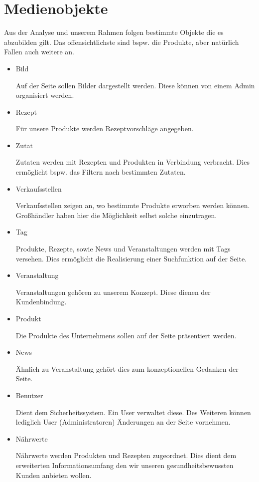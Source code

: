 \documentclass[12pt,a4paper,oneside,ngerman]{article}
\begin{document}
\section{Medienobjekte} %
Aus der Analyse und unserem Rahmen folgen bestimmte Objekte die es abzubilden gilt. Das offensichtlichste sind bspw. die Produkte, aber natürlich Fallen auch weitere an.
\begin{itemize}
\item Bild

Auf der Seite sollen Bilder dargestellt werden. Diese können von einem Admin organisiert werden.

\item Rezept

Für unsere Produkte werden Rezeptvorschläge angegeben.

\item Zutat

Zutaten werden mit Rezepten und Produkten in Verbindung verbracht. Dies ermöglicht bspw. das Filtern nach bestimmten Zutaten.

\item Verkaufsstellen

Verkaufsstellen zeigen an, wo bestimmte Produkte erworben werden können. Großhändler haben hier die Möglichkeit selbst solche einzutragen.

\item Tag

Produkte, Rezepte, sowie News und Veranstaltungen werden mit Tags versehen. Dies ermöglicht die Realisierung einer Suchfunktion auf der Seite.

\item Veranstaltung

Veranstaltungen gehören zu unserem Konzept. Diese dienen der Kundenbindung.

\item Produkt

Die Produkte des Unternehmens sollen auf der Seite präsentiert werden.

\item News

Ähnlich zu Veranstaltung gehört dies zum konzeptionellen Gedanken der Seite.

\item Benutzer

Dient dem Sicherheitssystem. Ein User verwaltet diese. Des Weiteren können lediglich User (Administratoren) Änderungen an der Seite vornehmen.

\item Nährwerte

Nährwerte werden Produkten und Rezepten zugeordnet. Dies dient dem erweiterten Informationsumfang den wir unseren gesundheitsbewussten Kunden anbieten wollen.

\end{itemize}
\end{document}
